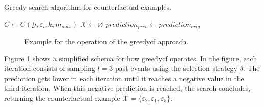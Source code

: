 {
\setlength{\algomargin}{1.25em}
\small
\begin{algorithm}[ht]
\caption{Greedy search algorithm for counterfactual examples.}
\label{a_GreedyCF}
    $C \gets C(\mathcal{G}, \varepsilon_i, k, m_{max})$\;
    $\mathcal{X} \gets \varnothing$\;
    $prediction_{prev} \gets prediction_{orig}$\;
\end{algorithm}
}

\begin{figure}[ht]
    \centering
    
    \caption{Example for the operation of the \gls{greedycf} approach.}
    \label{f_GreedyBaseline}
\end{figure}

Figure \ref{f_GreedyBaseline} shows a simplified schema for how \gls{greedycf} operates. In the figure, each iteration consists of sampling $l = 3$ past events using the selection strategy $\delta$. The prediction gets lower in each iteration until it reaches a negative value in the third iteration. When this negative prediction is reached, the search concludes, returning the counterfactual example $\mathcal{X} = \{\varepsilon_2, \varepsilon_1, \varepsilon_5\}$.



